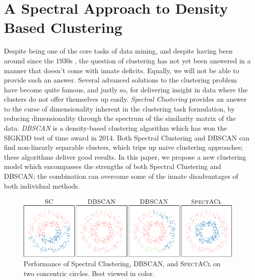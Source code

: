 \chapter{A Spectral Approach to Density Based Clustering}
Despite being one of the core tasks of data mining, and despite having been around since the $1930$s \citep{driver1932quantitative,klimek1935culture,tryon1939cluster}, the question of clustering has not yet been answered in a
manner that doesn't come with innate deficits. Equally, we will not be able to provide such an answer. Several advanced solutions to the clustering problem have become quite famous, and justly so, for delivering insight in data where the clusters do not offer themselves up easily.  \emph{Spectral Clustering} provides an answer to the curse of dimensionality
inherent in the clustering task formulation, by reducing dimensionality through the spectrum of the
similarity matrix of the data.  \emph{DBSCAN} \citep{ester1996density} is a density-based clustering algorithm 
which has won the SIGKDD test of time award in 2014.  Both Spectral Clustering and DBSCAN can find 
non-linearly separable clusters, which trips up naive clustering approaches; these algorithms deliver 
good results. In this paper, we propose a new clustering model which encompasses the strengths of both 
Spectral Clustering and DBSCAN; the combination can overcome some of the innate disadvantages of both 
individual methods.
\begin{figure}[t]
\centering
\includegraphics[width=\linewidth]{pics/SAIntroCircles.pdf}
%
\caption{Performance of Spectral Clustering, DBSCAN, and \textsc{SpectACl} on two concentric circles. Best viewed in color.}
\label{fig:intro}
\end{figure}

